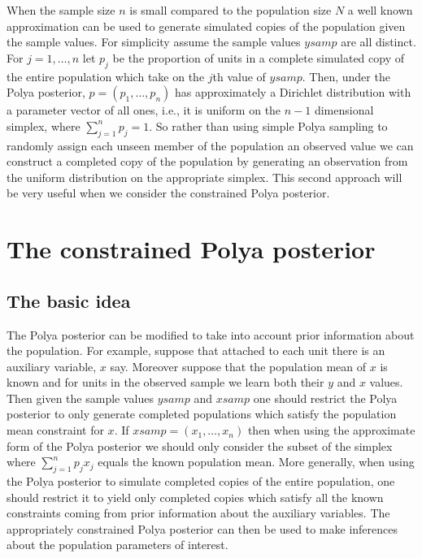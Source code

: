 \documentclass{article}
\begin{document}
When the sample size $n$ is small compared to the population 
size $N$  a  well known approximation can be used to generate
simulated copies of the population given the sample values.
For simplicity
assume the sample values $ysamp$ are all distinct.
 For $j=1,\ldots,n$ let $p_j$ be
the proportion of units in a complete simulated copy of the entire
population which take on the $j$th value of $ysamp$. Then, under the
Polya posterior, $p=(p_1,\ldots,p_n)$ has approximately a
Dirichlet distribution with a parameter vector of all ones, i.e.,
it is uniform on the $n-1$ dimensional simplex, where
$\sum_{j=1}^{n} p_j=1$. So rather than using simple Polya sampling to
randomly assign each unseen member of the population an observed 
value we can construct a completed copy 
of the population by generating an observation from the uniform
distribution on the appropriate simplex. 
This second approach  will be very
useful when we consider the constrained Polya posterior.

\section{The constrained Polya posterior}

\subsection{The basic idea}

The Polya posterior can be modified to take into account 
prior information about the population. For example, suppose
that  attached to each unit there is an auxiliary variable, $x$ say.  
Moreover suppose that the population mean of $x$ is known and for 
units in the observed sample we learn both their $y$ and $x$ values.
Then given the sample values $ysamp$ and 
$xsamp$  one should restrict the Polya posterior to only  generate 
completed populations which satisfy the population mean constraint
for $x$.
If $xsamp=(x_1,\ldots,x_n)$ then when using the approximate form 
of the Polya posterior we should only consider the subset of 
the simplex where $\sum_{j=1}^n p_j x_j$ equals the known 
population mean.
More generally,  when using the Polya
posterior to simulate completed copies of the entire population,
one should restrict it to  yield  only completed
copies which satisfy all the known constraints coming from  prior
information about  the auxiliary variables. The appropriately
constrained Polya posterior can then be used to make inferences
about the population parameters of interest. 
\end{document}
